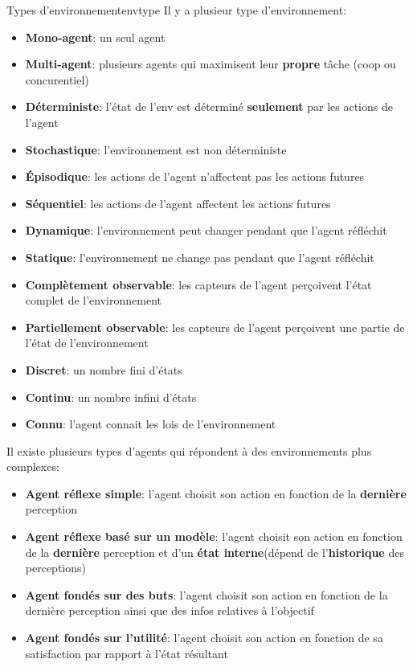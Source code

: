 \begin{definition}{Types d'environnement}{envtype}
    Il y a plusieur type d'environnement:

    \begin{itemize}
        \item \textbf{Mono-agent}: un seul agent
        \item \textbf{Multi-agent}: plusieurs agents qui maximisent leur \textbf{propre} tâche (coop ou concurentiel)
        \item \textbf{Déterministe}: l'état de l'env est déterminé \textbf{seulement} par les actions de l'agent
        \item \textbf{Stochastique}: l'environnement est non déterministe
        \item \textbf{Épisodique}: les actions de l'agent n'affectent pas les actions futures
        \item \textbf{Séquentiel}: les actions de l'agent affectent les actions futures
        \item \textbf{Dynamique}: l'environnement peut changer pendant que l'agent réfléchit
        \item \textbf{Statique}: l'environnement ne change pas pendant que l'agent réfléchit
        \item \textbf{Complètement observable}: les capteurs de l'agent perçoivent l'état complet de l'environnement
        \item \textbf{Partiellement observable}: les capteurs de l'agent perçoivent une partie de l'état de l'environnement
        \item \textbf{Discret}: un nombre fini d'états
        \item \textbf{Continu}: un nombre infini d'états
        \item \textbf{Connu}: l'agent connait les lois de l'environnement
    \end{itemize}
\end{definition}

Il existe plusieurs types d'agents qui répondent à des environnements plus complexes:
\begin{itemize}
    \item \textbf{Agent réflexe simple}: l'agent choisit son action en fonction de la \textbf{dernière} perception
    \item \textbf{Agent réflexe basé sur un modèle}: l'agent choisit son action en fonction de la \textbf{dernière} perception et d'un \textbf{état interne}(dépend de l'\textbf{historique} des perceptions) 
    \item \textbf{Agent fondés sur des buts}: l'agent choisit son action en fonction de la dernière perception 
        ainsi que des infos relatives à l'objectif
    \item \textbf{Agent fondés sur l'utilité}: l'agent choisit son action en fonction de 
        sa satisfaction par rapport à l'état résultant
\end{itemize}

